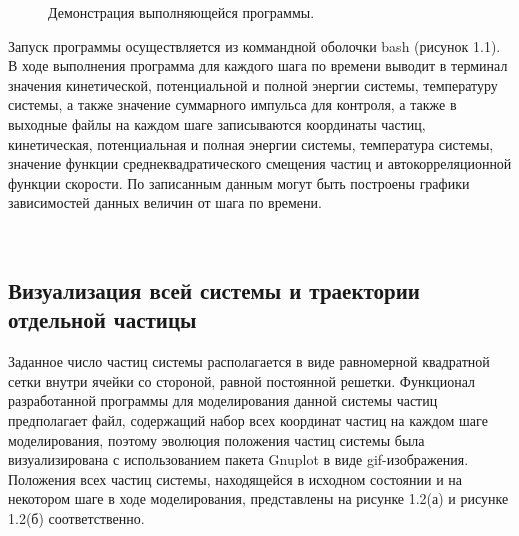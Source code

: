 \documentclass[14pt,a4paper,report]{ncc}
\begin{document}
\begin{figure}[h]
\caption{Демонстрация выполняющейся программы.}
\label{ris:image}
\end{figure}
Запуск программы осуществляется из коммандной оболочки bash (рисунок 1.1). В ходе выполнения программа для каждого шага по времени выводит в терминал значения кинетической, потенциальной и полной энергии системы, температуру системы, а также значение суммарного импульса для контроля, а также в выходные файлы на каждом шаге записываются координаты частиц, кинетическая, потенциальная и полная энергии системы, температура системы, значение функции среднеквадратического смещения частиц и автокорреляционной функции скорости. По записанным данным могут быть построены графики зависимостей данных величин от шага по времени.
\



\
\subsection{Визуализация всей системы и траектории отдельной частицы}
Заданное число частиц системы располагается в виде равномерной квадратной сетки внутри ячейки со стороной, равной постоянной решетки. Функционал разработанной программы для моделирования данной системы частиц предполагает файл, содержащий набор всех координат частиц на каждом шаге моделирования, поэтому эволюция положения частиц системы была визуализирована с использованием пакета Gnuplot в виде gif-изображения. Положения всех частиц системы, находящейся в исходном состоянии и на некотором шаге в ходе моделирования, представлены на рисунке 1.2(а) и рисунке 1.2(б) соответственно.
\end{document}
